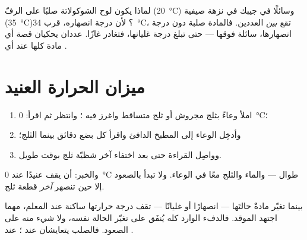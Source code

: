 \begin{example}\label{ex:g4:changes-of-state:reading}
لماذا يكون لوح الشوكولاتة صلبًا على الرفّ (\qty{20}{\celsius})
وسائلًا في جيبك في نزهة صيفية (\qty{35}{\celsius})؟ لأن درجة
انصهاره، قرب \qty{34}{\celsius}، تقع \emph{بين} العددين. فالمادة
صلبة دون درجة انصهارها، سائلة فوقها --- حتى تبلغ درجة غليانها،
فتغادر غازًا. عددان يحكيان قصة أي مادة كلها عند أي .
\end{example}

\section{ميزان الحرارة العنيد}

\begin{method}\label{met:g4:changes-of-state:watch}
\begin{enumerate}
  \item املأ وعاءً بثلج مجروش أو ثلج متساقط واغرز فيه ؛ وانتظر ثم اقرأ: \qty{0}{\celsius}؛
  \item وأدخِل الوعاء إلى المطبخ الدافئ واقرأ  كل
        بضع دقائق بينما  الثلج؛
  \item وواصِل القراءة حتى بعد اختفاء آخر شظيّة ثلج بوقت طويل.
\end{enumerate}
والخبر: أن  يقف عنيدًا عند \qty{0}{\celsius} طوال
 --- والماء والثلج معًا في الوعاء. ولا تبدأ 
بالصعود إلا حين تنصهر \emph{آخر} قطعة ثلج.
\end{method}

\begin{proposition}\label{prop:g4:changes-of-state:plateau}
بينما تغيّر مادةٌ حالتَها --- انصهارًا أو غليانًا --- تقف درجة
حرارتها ساكنة عند المعلم، مهما اجتهد الموقد. فالدفء الوارد كله
يُنفَق على تغيّر الحالة نفسه، ولا شيء منه على الصعود. فالصلب
 يتعايشان عند ؛   عند .
\end{proposition}

